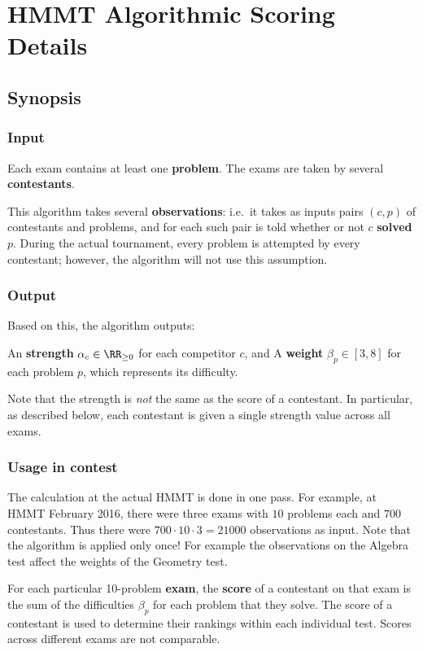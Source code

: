\chapter{HMMT Algorithmic Scoring Details}
\section{Synopsis}
\subsection{Input}
Each exam contains at least one \textbf{problem}.
The exams are taken by several \textbf{contestants}.

This algorithm takes several \textbf{observations}:
i.e.\ it takes as inputs pairs $(c,p)$ of contestants and problems,
and for each such pair is told whether or not $c$ \textbf{solved} $p$.
During the actual tournament, every problem is attempted by every contestant;
however, the algorithm will not use this assumption.

\subsection{Output}
Based on this, the algorithm outputs:
\begin{itemize}
	\ii An \textbf{strength} $\alpha_c \in \RR_{\ge 0}$ for each competitor $c$, and
	\ii A \textbf{weight} $\beta_p \in [3,8]$ for each problem $p$,
	which represents its difficulty.
\end{itemize}
Note that the strength is \emph{not} the same as the score of a contestant.
In particular, as described below,
each contestant is given a single strength value across all exams.

\subsection{Usage in contest}
The calculation at the actual HMMT is done in one pass.
For example, at HMMT February 2016, there were three exams with $10$ problems
each and $700$ contestants.
Thus there were $700 \cdot 10 \cdot 3 = 21000$ observations as input.
Note that the algorithm is applied only once!
For example the observations on the Algebra test
affect the weights of the Geometry test.

For each particular 10-problem \textbf{exam},
the \textbf{score} of a contestant on that exam is the sum of the 
difficulties $\beta_p$ for each problem that they solve.
The score of a contestant is used to determine their rankings
within each individual test.
Scores across different exams are not comparable.


